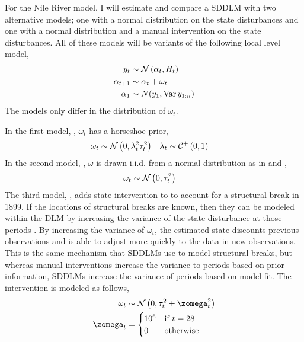 \documentclass{article}
\begin{document}
For the Nile River model, I will estimate and compare a SDDLM with two alternative models; one with a normal distribution on the state disturbances and one with a normal distribution and a manual intervention on the state disturbances.
All of these models will be variants of the following local level model,
\begin{equation}
  \label{eq:21}
  \begin{aligned}[t]
    y_{t} &\sim \mathcal{N}\left(\alpha_{t}, H_{t}\right) \\
    \alpha_{t + 1} &\sim \alpha_{t} + \omega_{t} \\
    \alpha_{1} &\sim N(y_{1}, \operatorname{Var} y_{1:n})
  \end{aligned}
\end{equation}
The models only differ in the distribution of $\omega_{t}$.

In the first model, , $\omega_{t}$ has a horseshoe prior,
\begin{equation}
  \label{eq:22}
  \begin{aligned}[t]
    \omega_{t} & \sim \mathcal{N}\left(0, \lambda^{2}_{t} \tau_{t}^{2}\right) & \lambda_{t} & \sim \mathcal{C}^{+}\left(0, 1\right)
  \end{aligned}
\end{equation}
In the second model, , $\omega$ is  drawn i.i.d. from a normal distribution as in \textcite{DurbinKoopman2001} and \textcite{petris2011state},
\begin{equation}
  \label{eq:9}
  \begin{aligned}[t]
    \omega_{t} & \sim \mathcal{N}\left(0, \tau_{t}^{2}\right)
  \end{aligned}
\end{equation}
The third model, , adds state intervention to  to account for a structural break in 1899.
If the locations of structural breaks are known, then they can be modeled within the DLM by increasing the variance of the state disturbance at those periods \textcite[Chapter 11][]{WestHarrison1997}.
By increasing the variance of $\omega_{t}$, the estimated state discounts previous observations and is able to adjust more quickly to the data in new observations.
This is the same mechanism that SDDLMs use to model structural breaks, but whereas manual interventions increase the variance to periods based on prior information, SDDLMs increase the variance of periods based on model fit.
The intervention is modeled as follows,
\begin{equation}
  \label{eq:12}
  \begin{aligned}[t]
    \omega_{t} & \sim \dnorm{0, \tau_{t}^{2} + \zomega_{t}^{2}} \\
    \zomega_{t} & = 
    \begin{cases}
      10^{6} & \text{if $t = 28$} \\
      0 & \text{otherwise}
    \end{cases}
  \end{aligned}
\end{equation}
\end{document}
